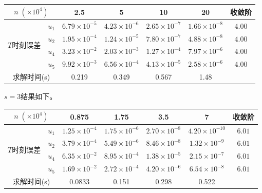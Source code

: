 \documentclass[lang=cn,10pt,bibend=bibtex]{elegantbook}
\begin{document}
\vspace{-.8em}
\begin{table}[H]
  \centering
  \renewcommand\arraystretch{0.9}
  \begin{tabular}{cc|cccc|c}
  \multicolumn{2}{c|}{$n\;(\times 10^4)$}                  & 2.5 & 5 & 10 & 20  & 收敛阶 \\ \hline
  \multicolumn{1}{c|}{\multirow{4}{*}{$T$时刻误差}} & \multicolumn{1}{c|}{$u_1$} & $6.79\times 10^{-5}$ &  $4.23\times 10^{-6}$  & $2.65\times 10^{-7}$  & $1.66\times 10^{-8}$    &  $4.00$   \\
  \multicolumn{1}{c|}{}                         & \multicolumn{1}{c|}{$u_2$} & $1.95\times 10^{-4}$ &  $1.24\times 10^{-5}$     & $7.80\times 10^{-7}$  & $4.88\times 10^{-8}$    &  $4.00$   \\
  \multicolumn{1}{c|}{}                         & \multicolumn{1}{c|}{$u_4$} & $3.23\times 10^{-2}$ &  $2.03\times 10^{-3}$     & $1.27\times 10^{-4}$  & $7.97\times 10^{-6}$     &  $4.00$   \\
  \multicolumn{1}{c|}{}                         & \multicolumn{1}{c|}{$u_5$} & $9.92\times 10^{-3}$ &  $6.56\times 10^{-4}$     & $4.13\times 10^{-5}$  & $2.58\times 10^{-6}$     &  $4.00$  \\ \hline
  \multicolumn{2}{c|}{求解时间(s)} & 0.219 & 0.349 & 0.567 & 1.48 & 
  \end{tabular}
\end{table}

$s=3$结果如下。

\vspace{-.8em}
\begin{table}[htbp]
  \centering
  \renewcommand\arraystretch{0.9}
  \begin{tabular}{cc|cccc|c}
  \multicolumn{2}{c|}{$n\;(\times 10^4)$}                  & 0.875 & 1.75 & 3.5 & 7  & 收敛阶 \\ \hline
  \multicolumn{1}{c|}{\multirow{4}{*}{$T$时刻误差}} & \multicolumn{1}{c|}{$u_1$} & $1.25\times 10^{-4}$ &  $1.75\times 10^{-6}$  & $2.70\times 10^{-8}$  & $4.20\times 10^{-10}$    &  $6.01$   \\
  \multicolumn{1}{c|}{}                         & \multicolumn{1}{c|}{$u_2$} & $3.79\times 10^{-4}$ &  $5.49\times 10^{-6}$     & $8.46\times 10^{-8}$  & $1.32\times 10^{-9}$    &  $6.01$   \\
  \multicolumn{1}{c|}{}                         & \multicolumn{1}{c|}{$u_4$} & $6.35\times 10^{-2}$ &  $8.95\times 10^{-4}$     & $1.38\times 10^{-5}$  & $2.15\times 10^{-7}$     &  $6.01$   \\
  \multicolumn{1}{c|}{}                         & \multicolumn{1}{c|}{$u_5$} & $1.69\times 10^{-2}$ &  $2.72\times 10^{-4}$     & $4.20\times 10^{-6}$  & $6.54\times 10^{-8}$     &  $6.01$  \\ \hline
  \multicolumn{2}{c|}{求解时间(s)} & 0.0833 & 0.151 & 0.298 & 0.522 & 
  \end{tabular}
\end{table}
\vspace{-1em}
\end{document}
